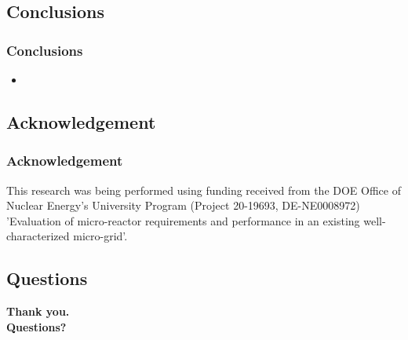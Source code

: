 \subsection{Conclusions}

\begin{frame}
\frametitle{Conclusions}

    \begin{itemize}
        \item 

    \end{itemize}
\end{frame}


\subsection{Acknowledgement}

\begin{frame}
\frametitle{Acknowledgement}

This research was being performed using funding received from the DOE Office of Nuclear Energy’s University Program (Project 20-19693, DE-NE0008972) ’Evaluation of micro-reactor requirements and performance in an existing well-characterized micro-grid’.

\end{frame}


\subsection{Questions}

\begin{frame}
  \begin{center}
    \Huge{\textbf{Thank you.\\ Questions?}}
  \end{center}
\end{frame}
